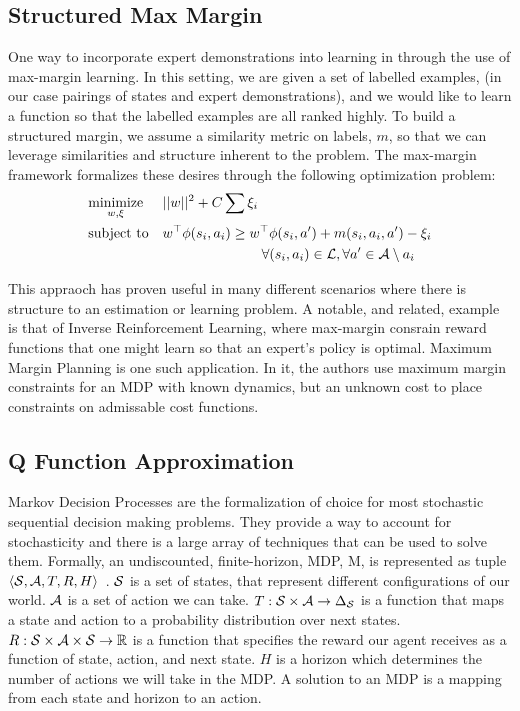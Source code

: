 \subsection{Structured Max Margin}
One way to incorporate expert demonstrations into learning in through the use of max-margin learning.
In this setting, we are given a set of labelled examples,  (in our case pairings of states and expert demonstrations), and we would 
like to learn a function so that the labelled examples are all ranked highly.
To build a structured margin, we assume a similarity metric on labels, $m$,  so that we can leverage 
similarities and structure inherent to the problem.
The max-margin framework formalizes these desires through the following optimization problem:
\begin{equation}
\begin{aligned}
& \underset{w, \xi}{\text{minimize}}  & & ||w||^2 + C\sum \xi_i\\
& \text{subject to} & &w^\top \phi(s{}_i, a{}_i) \geq w^\top \phi(s{}_i, a{}') + m(s{}_i, a{}_i, a{}') - \xi_i 
\\&&&\hspace{2.5cm}\forall (s{}_i, a{}_i) \in \mathcal{L}{}, \forall a{}' \in \mathcal{A}{}\setminus a{}_i
\end{aligned}
\end{equation}


This appraoch has proven useful in many different scenarios where there is structure to an estimation or learning problem.
A notable, and related, example is that of Inverse Reinforcement Learning, where max-margin consrain reward functions that one might learn so that an expert's policy is optimal.
Maximum Margin Planning is one such application. 
In it, the authors use maximum margin constraints for an MDP with known dynamics, but an unknown cost to place constraints on admissable cost functions.
\subsection{Q Function Approximation}
Markov Decision Processes are the formalization of choice for most stochastic sequential decision making problems.
They provide a way to account for stochasticity and there is a large array of techniques that can be used to solve them.
Formally, an undiscounted, finite-horizon, MDP, M, is represented as tuple $\langle\mathcal{S},\mathcal{A},T,R, H\rangle$~\cite{puterman1994}.
$\mathcal{S}{}$ is a set of states, that represent different configurations of our world.
$\mathcal{A}{}$ is a set of action we can take.
$T:\mathcal{S}{} \times \mathcal{A}{} \rightarrow \Delta_{\mathcal{S}{}}$ is a function that maps a state and action to a probability distribution over next states.
$R:\mathcal{S}{}\times \mathcal{A}{} \times \mathcal{S}{} \rightarrow \mathbb{R}$ is a function that specifies the reward our agent receives as a function of state, action, and next state.
$H$ is a horizon which determines the number of actions we will take in the MDP.
A solution to an MDP is a mapping from each state and horizon to an action.

